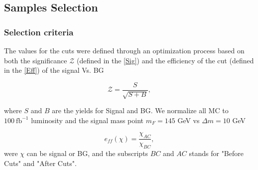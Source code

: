 \documentclass{beamer}
\begin{document}
\begin{frame}
\end{frame}


\begin{frame}
\section{Samples Selection}
\frametitle{Selection criteria}
\begin{justify}
The values for the cuts were defined through an optimization process based on both the significance $\mathcal{Z}$ (defined in the \ref{Sig}) and the efficiency of the cut (defined in the \ref{Eff}) of the signal Vs. BG 

\begin{equation}
\mathcal{Z}=\frac{S}{\sqrt{S+B}},\label{Sig}
\end{equation}

where $S$ and $B$ are the yields for Signal and BG. We normalize all MC to $100~\text{fb}^{-1}$ luminosity and the    signal mass point  $m_{F}=145$ GeV vs  $\Delta m=10$ GeV

\begin{equation}
e_{ff}(\chi)=\frac{\chi_{AC}}{\chi_{BC}},\label{Eff}
\end{equation}
were $\chi$ can be signal or BG, and the subscripts $BC$ and $AC$ stands for "Before Cuts" and "After Cuts".

\end{justify}

\end{frame}

\end{document}
